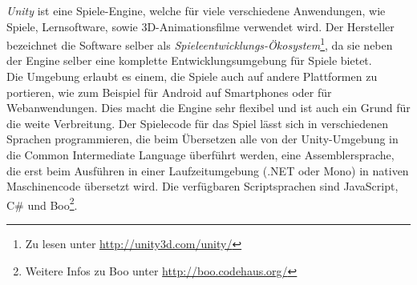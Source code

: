 \textit{Unity} ist eine Spiele-Engine, welche für viele verschiedene Anwendungen, wie Spiele, Lernsoftware, sowie 3D-Animationsfilme verwendet wird. Der Hersteller bezeichnet die Software selber als \textit{Spieleentwicklungs-Ökosystem}\footnote{Zu lesen unter \url{http://unity3d.com/unity/}}, da sie neben der Engine selber eine komplette Entwicklungsumgebung für Spiele bietet.\\
Die Umgebung erlaubt es einem, die Spiele auch auf andere Plattformen zu portieren, wie zum Beispiel für Android auf Smartphones oder für Webanwendungen. Dies macht die Engine sehr flexibel und ist auch ein Grund für die weite Verbreitung. Der Spielecode für das Spiel lässt sich in verschiedenen Sprachen programmieren, die beim Übersetzen alle von der Unity-Umgebung in die Common Intermediate Language überführt werden, eine Assemblersprache, die erst beim Ausführen in einer Laufzeitumgebung (.NET oder Mono) in nativen Maschinencode übersetzt wird. Die verfügbaren Scriptsprachen sind JavaScript, C\# und Boo\footnote{Weitere Infos zu Boo unter \url{http://boo.codehaus.org/}}.


